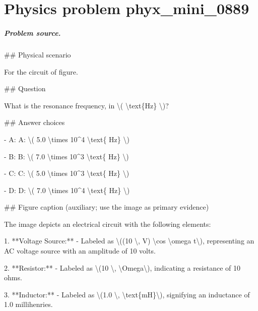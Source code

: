 
\chapter{Physics problem phyx\_mini\_0889}
\label{ch:PhyXMiniProblems_problem_phyx_mini_0889}

\paragraph{Problem source.}
\#\# Physical scenario

For the circuit of figure.

\#\# Question

What is the resonance frequency, in \textbackslash{}( \textbackslash{}text\{Hz\} \textbackslash{})?

\#\# Answer choices

- A: A: \textbackslash{}( 5.0 \textbackslash{}times 10\textasciicircum{}4 \textbackslash{}text\{ Hz\} \textbackslash{})

- B: B: \textbackslash{}( 7.0 \textbackslash{}times 10\textasciicircum{}3 \textbackslash{}text\{ Hz\} \textbackslash{})

- C: C: \textbackslash{}( 5.0 \textbackslash{}times 10\textasciicircum{}3 \textbackslash{}text\{ Hz\} \textbackslash{})

- D: D: \textbackslash{}( 7.0 \textbackslash{}times 10\textasciicircum{}4 \textbackslash{}text\{ Hz\} \textbackslash{})

\#\# Figure caption (auxiliary; use the image as primary evidence)

The image depicts an electrical circuit with the following elements:

1. **Voltage Source:** 
   - Labeled as \textbackslash{}((10 \textbackslash{}, V) \textbackslash{}cos \textbackslash{}omega t\textbackslash{}), representing an AC voltage source with an amplitude of 10 volts.

2. **Resistor:**
   - Labeled as \textbackslash{}(10 \textbackslash{}, \textbackslash{}Omega\textbackslash{}), indicating a resistance of 10 ohms.

3. **Inductor:**
   - Labeled as \textbackslash{}(1.0 \textbackslash{}, \textbackslash{}text\{mH\}\textbackslash{}), signifying an inductance of 1.0 millihenries.

